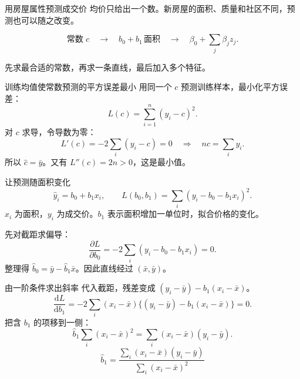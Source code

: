 \documentclass[aspectratio=169,11pt]{beamer}
\newcommand{\smallnote}[1]{\par\vspace{1.5mm}{\scriptsize #1\par}}
\begin{document}
\begin{frame}{用房屋属性预测成交价}
均价只给出一个数。新房屋的面积、质量和社区不同，预测也可以随之改变。
\par\medskip
\[
\text{常数 }c
\quad\longrightarrow\quad b_0+b_1\,\text{面积}
\quad\longrightarrow\quad\beta_0+\sum_j\beta_jz_j.
\]
\par\medskip
先求最合适的常数，再求一条直线，最后加入多个特征。
\end{frame}

\begin{frame}{训练均值使常数预测的平方误差最小}
用同一个 $c$ 预测训练样本，最小化平方误差：
\[
L(c)=\sum_{i=1}^{n}(y_i-c)^2.
\]
对 $c$ 求导，令导数为零：
\[
L'(c)=-2\sum_i(y_i-c)=0
\quad\Rightarrow\quad nc=\sum_i y_i.
\]
所以 $\hat c=\bar y$。又有 $L''(c)=2n>0$，这是最小值。
\smallnote{验证时，每套房屋都用训练均价作为常数预测。}
\end{frame}

\begin{frame}{让预测随面积变化}
\[
\hat y_i=b_0+b_1x_i,\qquad
L(b_0,b_1)=\sum_i(y_i-b_0-b_1x_i)^2.
\]
$x_i$ 为面积，$y_i$ 为成交价。$b_1$ 表示面积增加一单位时，拟合价格的变化。
\par\medskip
先对截距求偏导：
\[
\frac{\partial L}{\partial b_0}=-2\sum_i(y_i-b_0-b_1x_i)=0.
\]
整理得 $\hat b_0=\bar y-\hat b_1\bar x$。因此直线经过 $(\bar x,\bar y)$。
\end{frame}

\begin{frame}{由一阶条件求出斜率}
代入截距，残差变成 $(y_i-\bar y)-b_1(x_i-\bar x)$。
\[
\frac{\mathrm dL}{\mathrm db_1}
=-2\sum_i(x_i-\bar x)\{(y_i-\bar y)-b_1(x_i-\bar x)\}=0.
\]
把含 $b_1$ 的项移到一侧：
\[
\hat b_1\sum_i(x_i-\bar x)^2
=\sum_i(x_i-\bar x)(y_i-\bar y).
\]
\[
\boxed{\hat b_1=\frac{\sum_i(x_i-\bar x)(y_i-\bar y)}{\sum_i(x_i-\bar x)^2}}
\]
\smallnote{面积有变化时分母为正。分子描述面积与价格如何共同偏离各自均值。}
\end{frame}
\end{document}
